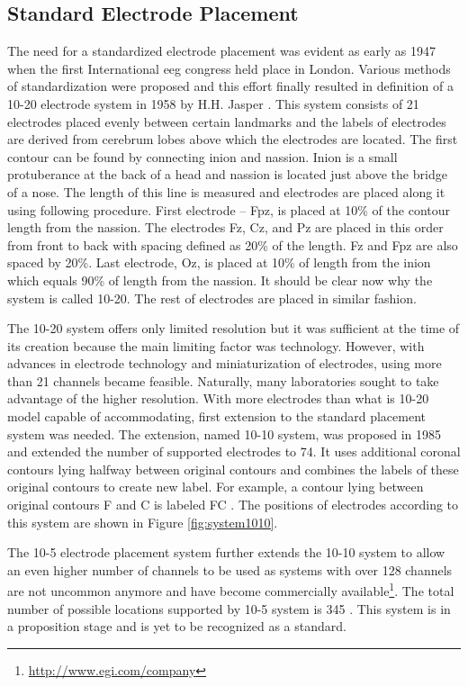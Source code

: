 \subsection{Standard Electrode Placement}
\label{ssec:elPlacement}
The need for a standardized electrode placement was evident as early as 1947 when
the first International \gls{eeg} congress held place in London. Various methods of
standardization were proposed and this effort finally resulted in definition
of a 10-20 electrode system in 1958 by H.H. Jasper \cite{placeSys}. 
This system consists of 21 electrodes placed evenly between certain landmarks
and the labels of electrodes are derived from cerebrum lobes above which the electrodes
are located. The first contour can be found by connecting inion and nassion.
Inion is a small protuberance at the back of a head and nassion is located just
above the bridge of a nose. The length of this line is measured and electrodes are
placed along it using following procedure. First electrode -- Fpz, is placed at
10\% of the contour length from the nassion. The electrodes Fz, Cz, and Pz are placed in this
order from front to back with spacing defined as 20\% of the length. Fz and Fpz are also
spaced by 20\%. Last electrode, Oz, is placed at 10\% of length from the inion
which equals 90\% of length from the nassion. It should be clear now why the system
is called 10-20. The rest of electrodes are placed in similar fashion.

The 10-20 system offers only limited resolution but it was sufficient at the
time of its creation because the main limiting factor was technology. However,
with advances in electrode technology and miniaturization of electrodes, using more than
21 channels became feasible. Naturally, many laboratories sought to take advantage of the
higher resolution. With more electrodes than what is 10-20 model capable of
accommodating, first extension to the standard placement system was needed. The
extension, named 10-10 system, was proposed in 1985 and extended the number of supported
electrodes to 74. It uses additional coronal contours lying halfway between
original contours and combines the labels of these original contours to create
new label. For example, a contour lying between original contours F and C is labeled FC \cite{placeSys}. The positions of electrodes according to this
system are shown in Figure \ref{fig:system1010}. 

The 10-5 electrode placement system further extends the 10-10 system to allow an
even higher number of channels to be used as systems with over 128 channels are
not uncommon anymore and have become commercially available\footnote{\url{http://www.egi.com/company}}.
The total number of possible locations supported by 10-5 system is 345 \cite{placeSys}.
This system is in a proposition stage and is yet to be recognized as a standard.


